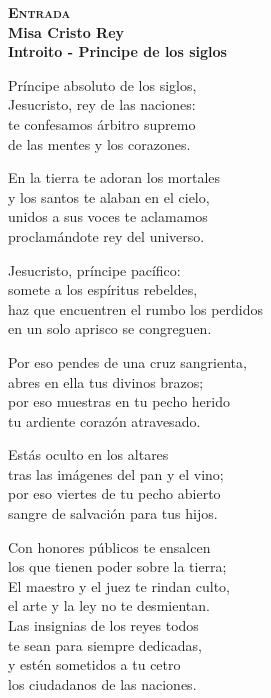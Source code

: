 \documentclass[letterpaper]{report}
\begin{document}
    \begin{center}
        {\scshape \Huge {\bfseries Entrada}} \\
        {\LARGE {\bfseries Misa Cristo Rey}} \\
        {\Large {\bfseries Introito - Principe de los siglos}}
    \end{center}
    
    Pr\'incipe absoluto de los siglos,\\
    Jesucristo, rey de las naciones:\\
    te confesamos \'arbitro supremo\\
    de las mentes y los corazones.
    
    En la tierra te adoran los mortales\\
    y los santos te alaban en el cielo,\\
    unidos a sus voces te aclamamos\\
    proclam\'andote rey del universo.
    
    Jesucristo, pr\'incipe pac\'ifico:\\
    somete a los esp\'iritus rebeldes,\\
    haz que encuentren el rumbo los perdidos\\
    en un solo aprisco se congreguen.
    
    Por eso pendes de una cruz sangrienta,\\
    abres en ella tus divinos brazos;\\
    por eso muestras en tu pecho herido\\
    tu ardiente coraz\'on atravesado.
    
    Est\'as oculto en los altares\\
    tras las im\'agenes del pan y el vino;\\
    por eso viertes de tu pecho abierto\\
    sangre de salvaci\'on para tus hijos.
    
    Con honores p\'ublicos te ensalcen\\
    los que tienen poder sobre la tierra;\\
    El maestro y el juez te rindan  culto,\\
    el arte y la ley no te desmientan.\\
  
    Las insignias de los reyes todos\\
    te sean para siempre dedicadas,\\
    y est\'en sometidos a tu cetro\\
    los ciudadanos de las naciones.
  
\end{document}
